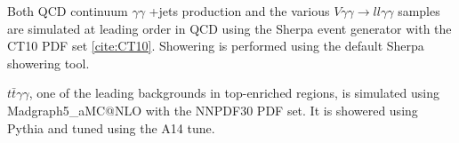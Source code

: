 Both QCD continuum $\gamma\gamma$ +jets production and the various $V\gamma\gamma \rightarrow ll\gamma\gamma$ samples are simulated at leading order in QCD using the Sherpa event generator with the CT10 PDF set \ref{cite:CT10}. Showering is performed using the default Sherpa showering tool. 

$t\bar{t}\gamma\gamma$, one of the leading backgrounds in top-enriched regions, is simulated using Madgraph5\_aMC@NLO with the NNPDF30 PDF set. It is showered using Pythia and tuned using the A14 tune.


\begin{table}[h!]
  \centering
\caption{Summary of nominal background samples}
\label{tab:bckg_samples}
\end{table}  

